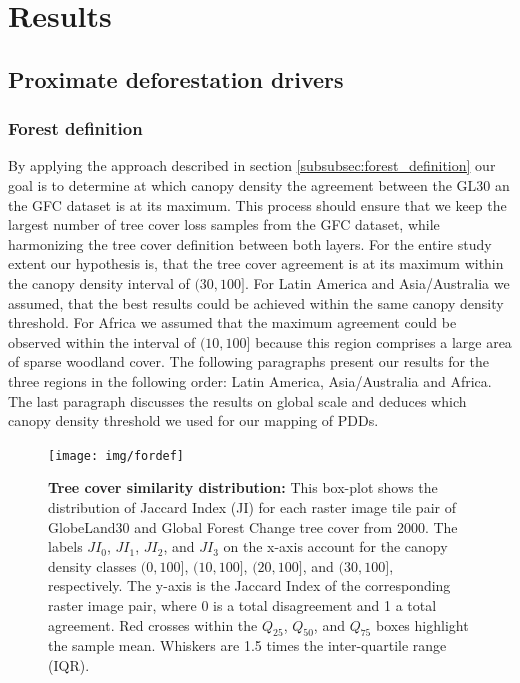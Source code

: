\chapter{Results}
\label{ch:results}
	\section{Proximate deforestation drivers}
	\label{sec:results_deforestation}
		\subsection{Forest definition}
		\label{subsec:results_forest_definition}
			By applying the approach described in section \ref{subsubsec:forest_definition} our goal is to determine at which canopy density the agreement between the \ac{GL30} an the \ac{GFC} dataset is at its maximum. This process should ensure that we keep the largest number of tree cover loss samples from the \ac{GFC} dataset, while harmonizing the tree cover definition between both layers. For the entire study extent our hypothesis is, that the tree cover agreement is at its maximum within the canopy density interval of $(30,100]$. For Latin America and Asia/Australia we assumed, that the best results could be achieved within the same canopy density threshold. For Africa we assumed that the maximum agreement could be observed within the interval of $(10,100]$ because this region comprises a large area of sparse woodland cover. The following paragraphs present our results for the three regions in the following order: Latin America, Asia/Australia and Africa. The last paragraph discusses the results on global scale and deduces which canopy density threshold we used for our mapping of \acp{PDD}.
			\begin{figure}[ht]
				\centering
				\texttt{[image: img/fordef]}
				\caption[Tree cover similarity distribution]{\textbf{Tree cover similarity distribution:} This box-plot shows the distribution of Jaccard Index (JI) for each raster image tile pair of GlobeLand30 and Global Forest Change tree cover from 2000. The labels $JI_0$, $JI_1$, $JI_2$, and $JI_3$ on the x-axis account for the canopy density classes $(0,100]$, $(10,100]$, $(20,100]$, and $(30,100]$, respectively. The y-axis is the Jaccard Index of the corresponding raster image pair, where 0 is a total disagreement and 1 a total agreement. Red crosses within the $Q_{25}$, $Q_{50}$, and $Q_{75}$ boxes highlight the sample mean. Whiskers are 1.5 times the inter-quartile range (IQR).}
				\label{fig:fordef}
			\end{figure}

